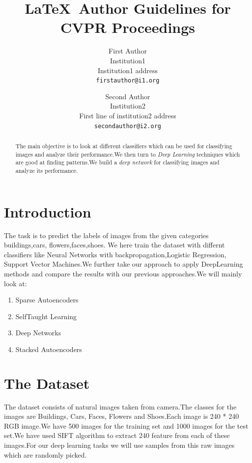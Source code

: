 \documentclass[10pt,twocolumn,letterpaper]{article}
\begin{document}
\title{\LaTeX\ Author Guidelines for CVPR Proceedings}

\author{First Author\\
Institution1\\
Institution1 address\\
{\tt\small firstauthor@i1.org}
\and
Second Author\\
Institution2\\
First line of institution2 address\\
{\tt\small secondauthor@i2.org}
}

\maketitle
\thispagestyle{empty}


\begin{abstract}
The main objective is to look at different classifiers which can be used for classifying images and analyze their performance.We then turn to \textit{Deep Learning} techniques which are good at finding patterns.We build a \textit{deep network} for classifying images and analyze its performance.
\end{abstract}
\section{Introduction}
The task is to predict the labels of images from the given categories buildings,cars,
flowers,faces,shoes. We here train the dataset with differnt classifiers like Neural Networks with backpropagation,Logistic Regression, Support Vector Machines.We further take our approach to apply DeepLearning methods and compare the results with our previous approaches.We will mainly look at:
 \begin{enumerate}
\item Sparse Autoencoders 
\item SelfTaught Learning 
\item Deep Networks 
\item Stacked Autoencoders 
 \end{enumerate}
\section{The Dataset}
The dataset consists of natural images taken from camera.The classes for the images are Buildings, Cars, Faces, Flowers and Shoes.Each image is 240 * 240 RGB image.We have 500 images for the training set and 1000 images for the test set.We have used SIFT algorithm to extract 240 feature from each of these images.For our deep learning tasks we will use samples from this raw images which are randomly picked.
\end{document}
